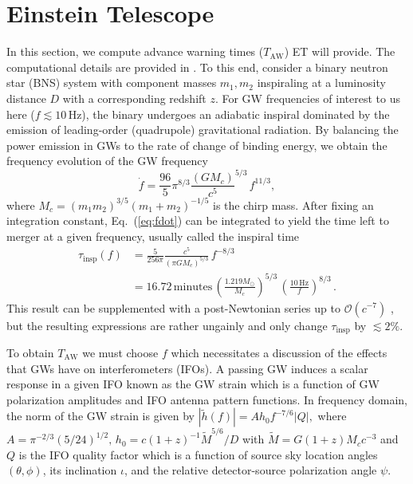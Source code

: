 \documentclass{aa}
\newcommand{\be}{\begin{equation}}
\newcommand{\ee}{\end{equation}}
\newcommand{\f}{\frac}
\newcommand{\nn}{\nonumber}
\newcommand{\ord}{\mathcal{O}}
\begin{document}
\section{Einstein Telescope}
\label{sect:et}
In this section, we compute advance warning times ($T_\text{AW}$) ET will provide.
The computational details are provided in \cite{Akcay18}.
To this end, consider a binary neutron star (BNS) system with component masses
$m_1, m_2$ inspiraling at a luminosity distance $D$ with a corresponding redshift $z$. For GW frequencies of interest to us here ($f \lesssim 10\,$Hz), the binary undergoes an adiabatic inspiral dominated by
the emission of leading-order (quadrupole)
gravitational radiation. By balancing the
power emission in GWs to the rate of change of binding energy, we obtain the frequency evolution of the GW frequency
%
\be
\dot{f} = \f{96}{5}\pi^{8/3} \f{(G M_c)}{c^5}^{5/3}\, f^{11/3}, \label{eq:fdot}
\ee
where $M_c  = {(m_1 m_2)^{3/5}}{(m_1+m_2)^{-1/5}} $ is the chirp mass.
After fixing an integration constant, Eq.~(\ref{eq:fdot})
can be integrated to yield the time left to merger at a given frequency, usually called the inspiral time
%
\begin{align}
\tau_\text{insp}(f) &= \f{5}{256\pi}\f{c^5}{(\pi G M_c)^{5/3}} \,f^{-8/3}\nn\\
&=16.72\,\text{minutes} \, \left(\f{1.219 M_\odot}{M_c}\right)^{5/3}\,\left(\f{10\,\text{Hz}}{f}\right)^{8/3}
\label{eq:tau_insp}\, .
\end{align}
%
This result can be supplemented with a post-Newtonian series up to $\ord(c^{-7})$ \citep{Blanchet_LRR}, but the resulting expressions
are rather ungainly and only change $\tau_\text{insp}$ by $\lesssim 2\%$.

To obtain $T_\text{AW}$ we must choose $f$
which necessitates a discussion of the
effects that GWs have on interferometers (IFOs).
A passing GW induces a scalar response in a given IFO known as the GW strain which is a function of GW polarization amplitudes and IFO antenna pattern functions. 
In frequency domain, the norm of the GW strain is given by
%
$|\tilde{h}(f)|=A h_0 f^{-7/6} |Q|,$ %
%
where $A= \pi^{-2/3}(5/24)^{1/2},\, h_0 = c  (1+z)^{-1}\tilde{M}^{5/6}/D$ with $\tilde{M}= G  (1+z)M_c c^{-3}$ and $Q$ is the IFO quality factor which is a function of source sky location angles $(\theta,\phi)$, its inclination $\iota$, and the relative detector-source polarization angle $\psi$.
\end{document}

